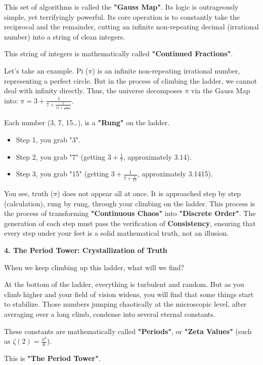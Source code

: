 This set of algorithms is called the \textbf{"Gauss Map"}. Its logic is outrageously simple, yet terrifyingly powerful. Its core operation is to constantly take the reciprocal and the remainder, cutting an infinite non-repeating decimal (irrational number) into a string of clean integers.

This string of integers is mathematically called \textbf{"Continued Fractions"}.

Let's take an example. Pi ($\pi$) is an infinite non-repeating irrational number, representing a perfect circle. But in the process of climbing the ladder, we cannot deal with infinity directly. Thus, the universe decomposes $\pi$ via the Gauss Map into: $\pi = 3 + \frac{1}{7 + \frac{1}{15 + \frac{1}{1 + \cdots}}}$.

Each number (3, 7, 15\ldots), is a \textbf{"Rung"} on the ladder.

\begin{itemize}
\item Step 1, you grab "3".
\item Step 2, you grab "7" (getting $3 + \frac{1}{7}$, approximately 3.14).
\item Step 3, you grab "15" (getting $3 + \frac{1}{7 + \frac{1}{15}}$, approximately 3.1415).
\end{itemize}

You see, truth ($\pi$) does not appear all at once. It is approached step by step (calculation), rung by rung, through your climbing on the ladder. This process is the process of transforming \textbf{"Continuous Chaos"} into \textbf{"Discrete Order"}. The generation of each step must pass the verification of \textbf{Consistency}, ensuring that every step under your feet is a solid mathematical truth, not an illusion.

\textbf{4. The Period Tower: Crystallization of Truth}

When we keep climbing up this ladder, what will we find?

At the bottom of the ladder, everything is turbulent and random. But as you climb higher and your field of vision widens, you will find that some things start to stabilize. Those numbers jumping chaotically at the microscopic level, after averaging over a long climb, condense into several eternal constants.

These constants are mathematically called \textbf{"Periods"}, or \textbf{"Zeta Values"} (such as $\zeta(2) = \frac{\pi^2}{6}$).

This is \textbf{"The Period Tower"}.

